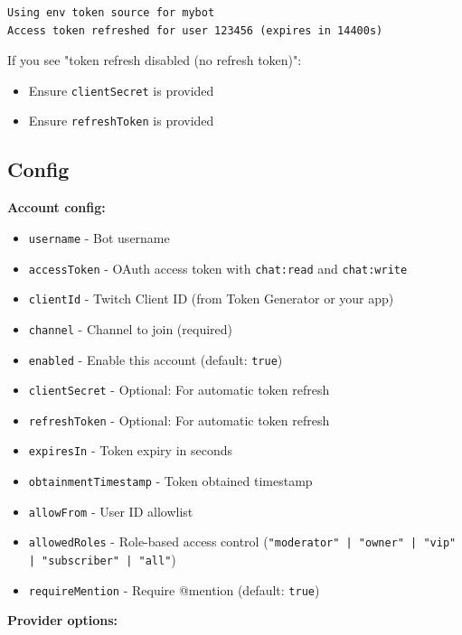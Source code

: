 \begin{lstlisting}
Using env token source for mybot
Access token refreshed for user 123456 (expires in 14400s)
\end{lstlisting}


If you see "token refresh disabled (no refresh token)":

\begin{itemize}
  \item Ensure \texttt{clientSecret} is provided
  \item Ensure \texttt{refreshToken} is provided
\end{itemize}


\subsection{Config}


\textbf{Account config:}

\begin{itemize}
  \item \texttt{username} - Bot username
  \item \texttt{accessToken} - OAuth access token with \texttt{chat:read} and \texttt{chat:write}
  \item \texttt{clientId} - Twitch Client ID (from Token Generator or your app)
  \item \texttt{channel} - Channel to join (required)
  \item \texttt{enabled} - Enable this account (default: \texttt{true})
  \item \texttt{clientSecret} - Optional: For automatic token refresh
  \item \texttt{refreshToken} - Optional: For automatic token refresh
  \item \texttt{expiresIn} - Token expiry in seconds
  \item \texttt{obtainmentTimestamp} - Token obtained timestamp
  \item \texttt{allowFrom} - User ID allowlist
  \item \texttt{allowedRoles} - Role-based access control (\texttt{"moderator" | "owner" | "vip" | "subscriber" | "all"})
  \item \texttt{requireMention} - Require @mention (default: \texttt{true})
\end{itemize}


\textbf{Provider options:}

